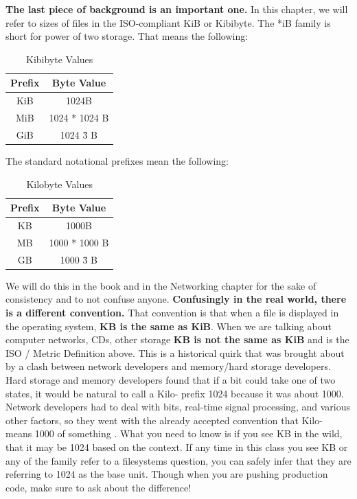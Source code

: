 \textbf{The last piece of background is an important one.} In this chapter, we will refer to sizes of files in the ISO-compliant KiB or Kibibyte.
The *iB family is short for power of two storage.
That means the following:

\begin{table}[h]
  \centering
\caption{Kibibyte Values}
\begin{tabular}{ | c | c | }
Prefix & Byte Value \\ \hline
KiB & 1024B \\
MiB & 1024 * 1024 B \\
GiB & 1024 \^ 3 B
\end{tabular}
\end{table}

The standard notational prefixes mean the following:

\begin{table}[h]
  \centering
\caption{Kilobyte Values}
\begin{tabular}{ | c | c | }
Prefix & Byte Value \\ \hline
KB & 1000B \\
MB & 1000 * 1000 B \\
GB & 1000 \^ 3 B
\end{tabular}
\end{table}

We will do this in the book and in the Networking chapter for the sake of consistency and to not confuse anyone.
\textbf{Confusingly in the real world, there is a different convention.}
That convention is that when a file is displayed in the operating system, \textbf{KB is the same as KiB}.
When we are talking about computer networks, CDs, other storage \textbf{KB is not the same as KiB} and is the ISO / Metric Definition above.
This is a historical quirk that was brought about by a clash between network developers and memory/hard storage developers.
Hard storage and memory developers found that if a bit could take one of two states, it would be natural to call a Kilo- prefix 1024 because it was about 1000.
Network developers had to deal with bits, real-time signal processing, and various other factors, so they went with the already accepted convention that Kilo- means 1000 of something \cite{iec}.
What you need to know is if you see KB in the wild, that it may be 1024 based on the context.
If any time in this class you see KB or any of the family refer to a filesystems question, you can safely infer that they are referring to 1024 as the base unit.
Though when you are pushing production code, make sure to ask about the difference!


